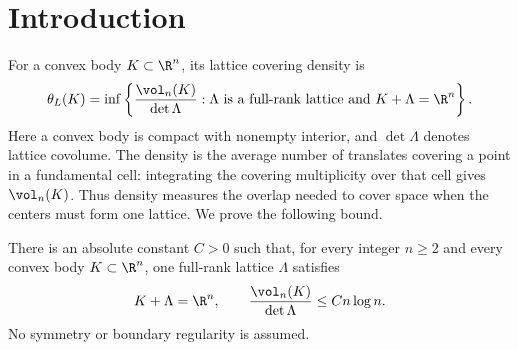 \section{Introduction}\label{sec:introduction}

For a convex body $K\subset\R^n$, its lattice covering density is
\[
 \theta_L(K)=\inf\left\{
 \frac{\vol_n(K)}{\det\Lambda}:\Lambda\text{ is a full-rank lattice and }
 K+\Lambda=\R^n\right\}.
\]
Here a convex body is compact with nonempty interior, and
$\det\Lambda$ denotes lattice covolume. The density is the average number
of translates covering a point in a fundamental cell: integrating the
covering multiplicity over that cell gives $\vol_n(K)$. Thus density
measures the overlap needed to cover space when the centers must form
one lattice. We prove the following bound.

\begin{theorem}\label{thm:main}
There is an absolute constant $C>0$ such that, for every integer
$n\ge2$ and every convex body $K\subset\R^n$, one full-rank lattice
$\Lambda$ satisfies
\[
 K+\Lambda=\R^n,\qquad
 \frac{\vol_n(K)}{\det\Lambda}\le Cn\log n.
\]
No symmetry or boundary regularity is assumed.
\end{theorem}
